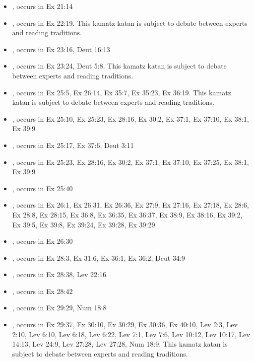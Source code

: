 \documentclass[14pt]{article}
\begin{document}
\begin{itemize}
\item {}, occurs in Ex 21:14

\item {}, occurs in Ex 22:19. This kamatz katan is subject to debate between experts and reading traditions.

\item {}, occurs in Ex 23:16, Deut 16:13

\item {}, occurs in Ex 23:24, Deut 5:8. This kamatz katan is subject to debate between experts and reading traditions.

\item {}, occurs in Ex 25:5, Ex 26:14, Ex 35:7, Ex 35:23, Ex 36:19. This kamatz katan is subject to debate between experts and reading traditions.

\item {}, occurs in Ex 25:10, Ex 25:23, Ex 28:16, Ex 30:2, Ex 37:1, Ex 37:10, Ex 38:1, Ex 39:9

\item {}, occurs in Ex 25:17, Ex 37:6, Deut 3:11

\item {}, occurs in Ex 25:23, Ex 28:16, Ex 30:2, Ex 37:1, Ex 37:10, Ex 37:25, Ex 38:1, Ex 39:9

\item {}, occurs in Ex 25:40

\item {}, occurs in Ex 26:1, Ex 26:31, Ex 26:36, Ex 27:9, Ex 27:16, Ex 27:18, Ex 28:6, Ex 28:8, Ex 28:15, Ex 36:8, Ex 36:35, Ex 36:37, Ex 38:9, Ex 38:16, Ex 39:2, Ex 39:5, Ex 39:8, Ex 39:24, Ex 39:28, Ex 39:29

\item {}, occurs in Ex 26:30

\item {}, occurs in Ex 28:3, Ex 31:6, Ex 36:1, Ex 36:2, Deut 34:9

\item {}, occurs in Ex 28:38, Lev 22:16

\item {}, occurs in Ex 28:42

\item {}, occurs in Ex 29:29, Num 18:8

\item {}, occurs in Ex 29:37, Ex 30:10, Ex 30:29, Ex 30:36, Ex 40:10, Lev 2:3, Lev 2:10, Lev 6:10, Lev 6:18, Lev 6:22, Lev 7:1, Lev 7:6, Lev 10:12, Lev 10:17, Lev 14:13, Lev 24:9, Lev 27:28, Lev 27:28, Num 18:9. This kamatz katan is subject to debate between experts and reading traditions.


\end{itemize}
\end{document}
